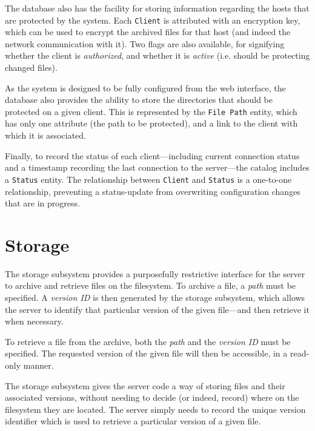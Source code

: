 The database also has the facility for storing information regarding the hosts
that are protected by the system. Each \verb!Client! is attributed with an
encryption key, which can be used to encrypt the archived files for that host
(and indeed the network communication with it). Two flags are also available,
for signifying whether the client is \emph{authorized}, and whether it is
\emph{active} (i.e. should be protecting changed files).

As the system is designed to be fully configured from the web interface, the
database also provides the ability to store the directories that should be
protected on a given client. This is represented by the \verb!File Path!
entity, which has only one attribute (the path to be protected), and a link to
the client with which it is associated.

Finally, to record the status of each client---including current connection
status and a timestamp recording the last connection to the server---the
catalog includes a \verb!Status! entity. The relationship between \verb!Client!
and \verb!Status! is a one-to-one relationship, preventing a status-update from
overwriting configuration changes that are in progress.

\section{Storage}

The storage subsystem provides a purposefully restrictive interface for the
server to archive and retrieve files on the filesystem. To archive a file,
a \emph{path} must be specified. A \emph{version ID} is then generated by the
storage subsystem, which allows the server to identify that particular version
of the given file---and then retrieve it when necessary.

To retrieve a file from the archive, both the \emph{path} and the \emph{version
ID} must be specified. The requested version of the given file will then be
accessible, in a read-only manner.

The storage subsystem gives the server code a way of storing files and their
associated versions, without needing to decide (or indeed, record) where on the
filesystem they are located. The server simply needs to record the unique
version identifier which is used to retrieve a particular version of a given
file.
